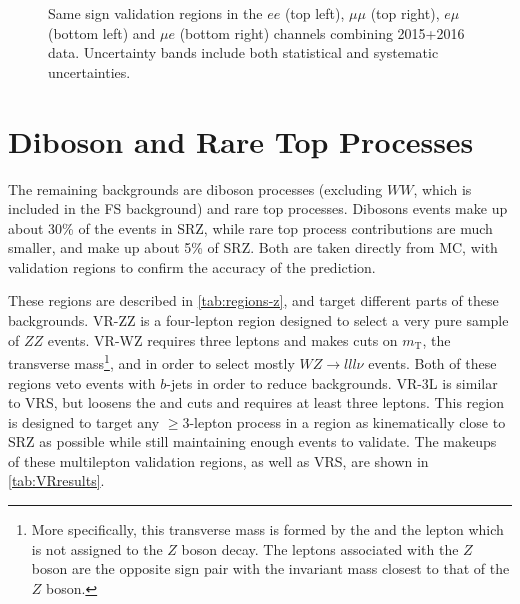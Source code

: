 \begin{centering}
\begin{figure}[!htb]
\caption{Same sign validation regions in the $ee$ (top left), $\mu\mu$ (top right), $e\mu$ (bottom left) and $\mu e$ (bottom right) channels combining 2015+2016 data. Uncertainty bands include both statistical and systematic uncertainties. \label{fig:fakes_validation}}
\end{figure}
\end{centering}

\section{Diboson and Rare Top Processes}
\label{sec:bg-other}

The remaining backgrounds are diboson processes (excluding $WW$, which is included in the \ac{FS} background) and rare top processes. Dibosons events make up about 30\% of the events in SRZ, while rare top process contributions are much smaller, and make up about 5\% of SRZ. Both are taken directly from \ac{MC}, with validation regions to confirm the accuracy of the prediction. 

These regions are described in \autoref{tab:regions-z}, and target different parts of these backgrounds. VR-ZZ is a four-lepton region designed to select a very pure sample of $ZZ$ events. VR-WZ requires three leptons and makes cuts on $m_\mathrm{T}$, the transverse mass\footnote{More specifically, this transverse mass is formed by the \met and the lepton which is not assigned to the $Z$ boson decay. The leptons associated with the $Z$ boson are the opposite sign pair with the invariant mass closest to that of the $Z$ boson. }, 
and \met in order to select mostly $WZ\rightarrow lll\nu$ events. Both of these regions veto events with $b$-jets in order to reduce \ttbar backgrounds. VR-3L is similar to VRS, but loosens the \HT and \met cuts and requires at least three leptons. This region is designed to target any $\geq3$-lepton process in a region as kinematically close to SRZ as possible while still maintaining enough events to validate. The makeups of these multilepton validation regions, as well as VRS, are shown in \autoref{tab:VRresults}.



